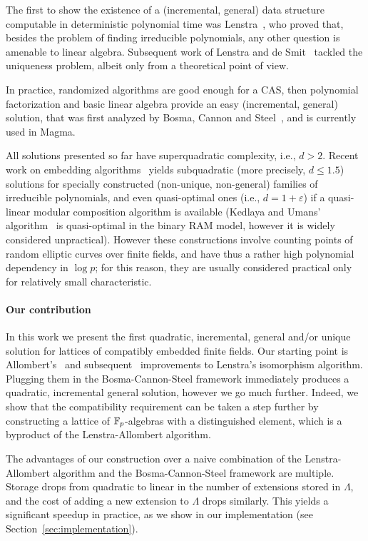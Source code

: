 \documentclass{sig-alternate}
\begin{document}
The first to show the existence of a (incremental, general) data
structure computable in deterministic polynomial time was
Lenstra~\cite{LenstraJr91}, who proved that, besides the problem of
finding irreducible polynomials, any other question is amenable to
linear algebra. %
Subsequent work of Lenstra and de
Smit~\cite{lenstra+desmit08-stdmodels} tackled the uniqueness problem,
albeit only from a theoretical point of view. %

In practice, randomized algorithms are good enough for a CAS, then
polynomial factorization and basic linear algebra provide an easy
(incremental, general) solution, that was first analyzed by Bosma,
Cannon and Steel~\cite{bosma+cannon+steel97}, and is currently used in
Magma. %

All solutions presented so far have superquadratic complexity, i.e.,
$d>2$. %
Recent work on embedding algorithms~\cite{DoSc12,DeDoSc13,DeDoSc2014}
yields subquadratic (more precisely, $d\le 1.5$) solutions for
specially constructed (non-unique, non-general) families of
irreducible polynomials, and even quasi-optimal ones (i.e.,
$d=1+\varepsilon$) if a quasi-linear modular composition algorithm is
available (Kedlaya and Umans' algorithm~\cite{KeUm11} is quasi-optimal
in the binary RAM model, however it is widely considered
unpractical). %
However these constructions involve counting points of random elliptic
curves over finite fields, and have thus a rather high polynomial
dependency in $\log p$; for this reason, they are usually considered
practical only for relatively small characteristic.


\paragraph{Our contribution}
In this work we present the first
quadratic, %
incremental, general and/or unique %
solution for lattices of compatibly embedded finite fields. %
Our starting point is Allombert's~\cite{Allombert02} and
subsequent~\cite{brieulle2018computing} improvements to Lenstra's
isomorphism algorithm. %
Plugging them in the Bosma-Cannon-Steel framework immediately produces
a quadratic, incremental general solution, however we go much
further. %
Indeed, we show that the compatibility requirement can be taken a step
further by constructing a lattice of $\mathbb{F}_{p}$-algebras with a
distinguished element, which is a byproduct of the Lenstra-Allombert
algorithm.

The advantages of our construction over a naive combination of the
Lenstra-Allombert algorithm and the Bosma-Cannon-Steel framework are
multiple. %
Storage drops from quadratic to linear in the number of extensions
stored in $\Lambda$, and the cost of adding a new extension to
$\Lambda$ drops similarly. %
This yields a significant speedup in practice, as we show in our
implementation (see Section~\ref{sec:implementation}).
\end{document}
